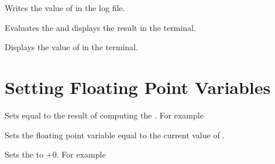 \documentclass[oneside]{book}
\begin{document}
\begin{function}{\FpVarLog}
\begin{syntax}
 
\end{syntax}
Writes the value of  in the log file.
\end{function}

\begin{function}{\FpShow}
\begin{syntax}
 
\end{syntax}
Evaluates the  and displays the
result in the terminal.
\end{function}

\begin{function}{\FpVarShow}
\begin{syntax}
 
\end{syntax}
Displays the value of  in the terminal.
\end{function}

\section{Setting Floating Point Variables}

\begin{function}{\FpSet}
\begin{syntax}
  
\end{syntax}
Sets  equal to the result of computing the
. For example
\begin{demohigh}
\FpSet {}
\FpUse \lTmpaFp
\end{demohigh}
\end{function}

\begin{function}{\FpSetEq}
\begin{syntax}
  
\end{syntax}
Sets the floating point variable  equal to the current
value of .
\end{function}

\begin{function}{\FpZero}
\begin{syntax}
 
\end{syntax}
Sets the  to $+0$. For example
\begin{demohigh}
\FpSet {}
\FpZero \lTmpaFp
\FpUse \lTmpaFp
\end{demohigh}
\end{function}
\end{document}
